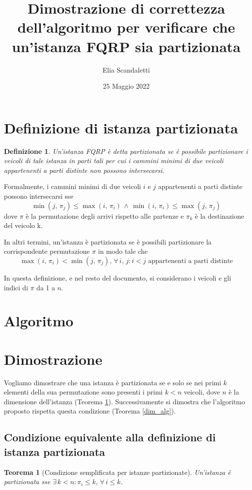 \documentclass{article}
\title{Dimostrazione di correttezza dell'algoritmo per verificare che un'istanza FQRP sia partizionata}
\author{Elia Scandaletti}
\date{25 Maggio 2022}
\newtheorem{definition}{Definizione}
\newtheorem{theorem}{Teorema}
\begin{document}
\maketitle

\tableofcontents

\clearpage

\section{Definizione di istanza partizionata}
\begin{definition}\label{def_part}
    Un'istanza FQRP è detta partizionata se è possibile partizionare i veicoli di tale istanza in parti tali per cui i cammini minimi di due veicoli appartenenti a parti distinte non possono intersecarsi.
\end{definition}
Formalmente, i cammini minimi di due veicoli $i$ e $j$ appartenenti a parti distinte possono intersecarsi sse
\[ \min(j,\, \pi_j) \leq \max(i,\, \pi_i)\, \wedge\, \min(i,\, \pi_i) \leq \max(j,\, \pi_j) \]
dove $\pi$ è la permutazione degli arrivi rispetto alle partenze e $\pi_k$ è la destinazione del veicolo k.

In altri termini, un'istanza è partizionata se è possibili partizionare la corrispondente permutazione $\pi$ in modo tale che
\begin{equation}
    \label{cond_part}
    \max(i,\, \pi_i) < \min(j,\, \pi_j),\, \forall\, i,\, j : i < j \mbox{ appartenenti a parti distinte}
\end{equation}

In questa definizione, e nel resto del documento, si considerano i veicoli e gli indici di $\pi$ da 1 a $n$.

\section{Algoritmo}\label{sect:alg}


\section{Dimostrazione}
Vogliamo dimostrare che una istanza è partizionata se e solo se nei primi $k$ elementi della sua permutazione sono presenti i primi $k < n$ veicoli, dove $n$ è la dimensione dell'istanza (Teorema \ref{dim_part_iniziale}).
Successivamente si dimostra che l'algoritmo proposto rispetta questa condizione (Teorema \ref{dim_alg}).

\subsection{Condizione equivalente alla definizione di istanza partizionata}
\begin{theorem}[Condizione semplificata per istanze partizionate]
    \label{dim_part_iniziale}
    Un'istanza è partizionata sse $\exists\, k < n : \pi_i \leq k,\, \forall\, i \leq k$.
\end{theorem}
\end{document}
